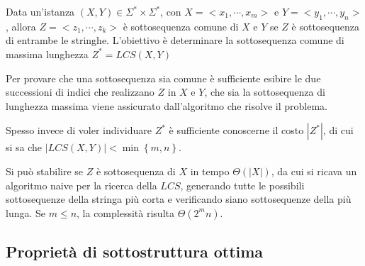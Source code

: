 \begin{definition}
    Data un'istanza $(X,Y) \in \Sigma^* \times \Sigma^*$, con
    $ X = < x_1, \cdots, x_m > $ e 
    $ Y = < y_1, \cdots, y_n > $,
    allora
    $ Z = < z_1, \cdots, z_k > $
    è sottosequenza comune di $X$ e $Y$ se $Z$ è sottosequenza di entrambe le stringhe.
    L'obiettivo è determinare la sottosequenza comune di massima lunghezza 
    $Z^* = LCS\left( X,Y \right)$
    \label{def:lcs}
\end{definition}
Per provare che una sottosequenza sia comune è sufficiente esibire le due successioni di indici che realizzano $Z$ in $X$ e $Y$, che sia la sottosequenza di lunghezza massima viene assicurato dall'algoritmo che risolve il problema.

Spesso invece di voler individuare $Z^*$ è sufficiente conoscerne il costo $|Z^*|$, di cui si sa che $|LCS(X,Y)| < \min\left\{ m,n \right\}$.

Si può stabilire se $Z$ è sottosequenza di $X$ in tempo $\Theta \left( |X| \right)$, da cui si ricava un algoritmo naive per la ricerca della $LCS$, generando tutte le possibili sottosequenze della stringa più corta e verificando siano sottosequenze della più lunga. Se $m \leq n$, la complessità risulta $\Theta \left( 2^{m} n \right)$.

\subsection{Proprietà di sottostruttura ottima}

